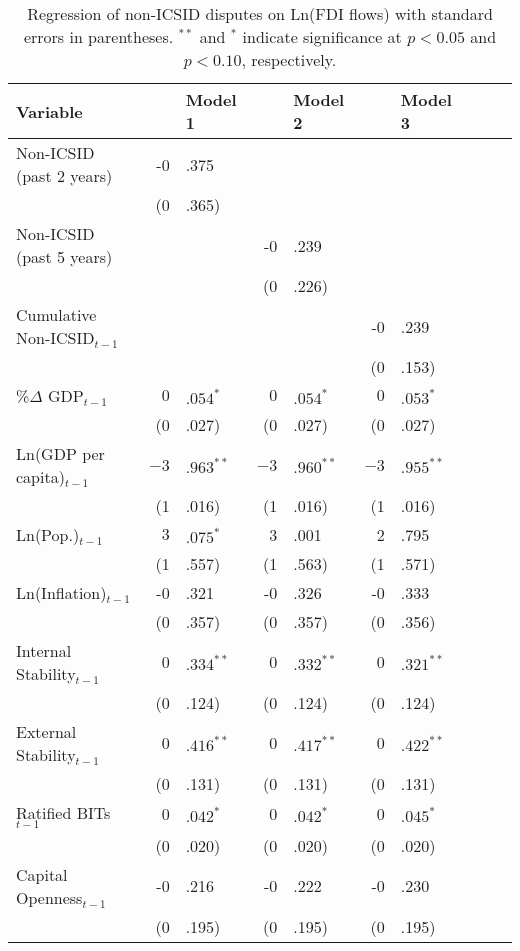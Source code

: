 \documentclass[12pt,onesided]{amsart}
\begin{document}
\begin{table}[ht]
\centering
\caption{Regression of non-ICSID disputes on Ln(FDI flows) with standard errors in parentheses. $^{**}$ and $^{*}$ indicate significance at $p< 0.05 $ and $p< 0.10 $, respectively.} 
\label{tab:nDispFDI}
{\footnotesize
\begin{tabular}{lr@{} lr@{}lr@{}lr@{}lr@{}}
 Variable && Model 1 && Model 2 && Model 3 \\ 
  \hline
\hline
Non-ICSID  (past 2 years) & -0&.375 &&  &&  \\ 
   & (0&.365) &&  &&  \\ 
  Non-ICSID  (past 5 years) &&  & -0&.239 &&  \\ 
   &&  & (0&.226) &&  \\ 
  Cumulative Non-ICSID$_{t-1}$ &&  &&  & -0&.239 \\ 
   &&  &&  & (0&.153) \\ 
  \%$\Delta$ GDP$_{t-1}$ & $0$&$.054^{\ast}$ & $0$&$.054^{\ast}$ & $0$&$.053^{\ast}$ \\ 
   & (0&.027) & (0&.027) & (0&.027) \\ 
  Ln(GDP per capita)$_{t-1}$ & $-3$&$.963^{\ast\ast}$ & $-3$&$.960^{\ast\ast}$ & $-3$&$.955^{\ast\ast}$ \\ 
   & (1&.016) & (1&.016) & (1&.016) \\ 
  Ln(Pop.)$_{t-1}$ & $3$&$.075^{\ast}$ & 3&.001 & 2&.795 \\ 
   & (1&.557) & (1&.563) & (1&.571) \\ 
  Ln(Inflation)$_{t-1}$ & -0&.321 & -0&.326 & -0&.333 \\ 
   & (0&.357) & (0&.357) & (0&.356) \\ 
  Internal Stability$_{t-1}$ & $0$&$.334^{\ast\ast}$ & $0$&$.332^{\ast\ast}$ & $0$&$.321^{\ast\ast}$ \\ 
   & (0&.124) & (0&.124) & (0&.124) \\ 
  External Stability$_{t-1}$ & $0$&$.416^{\ast\ast}$ & $0$&$.417^{\ast\ast}$ & $0$&$.422^{\ast\ast}$ \\ 
   & (0&.131) & (0&.131) & (0&.131) \\ 
  Ratified BITs$_{t-1}$ & $0$&$.042^{\ast}$ & $0$&$.042^{\ast}$ & $0$&$.045^{\ast}$ \\ 
   & (0&.020) & (0&.020) & (0&.020) \\ 
  Capital Openness$_{t-1}$ & -0&.216 & -0&.222 & -0&.230 \\ 
   & (0&.195) & (0&.195) & (0&.195) \\ 

\end{tabular}}
\end{table}
\end{document}
